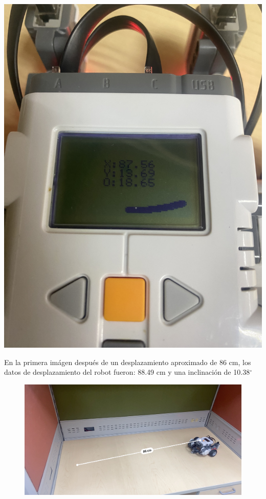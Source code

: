 \documentclass[oneside,onecolumn]{article}
\begin{document}
\includegraphics[scale=0.09]{graficos/error3.png}

En la primera imágen después de un desplazamiento aproximado de 86 cm, los datos de desplazamiento del robot fueron: 88.49 cm y una inclinación de 10.38$^{\circ}$

\begin{figure}[!hb]
  \centering
  \includegraphics[scale=0.18]{graficos/prueba1.JPG}
\end{figure}
\end{document}
